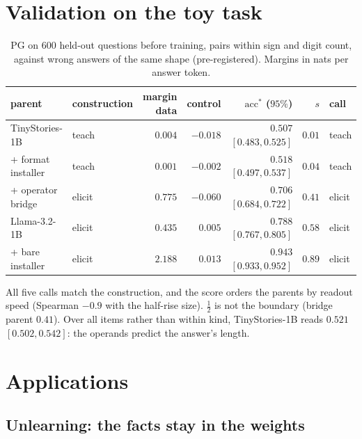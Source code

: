 \documentclass[11pt]{article}
\newcommand{\acc}{\mathrm{acc}^*}
\theoremstyle{definition}
\begin{document}
\section{Validation on the toy task}
\label{sec:toy}

\begin{table}[h]
\centering
\small
\begin{tabular}{llrrrrl}
\toprule
parent & construction & margin data & control & $\acc$ ($95\%$) & $s$ & call \\
\midrule
TinyStories-1B & teach & $0.004$ & $-0.018$ & $0.507$ $[0.483, 0.525]$ & $0.01$ & teach \\
\quad + format installer & teach & $0.001$ & $-0.002$ & $0.518$ $[0.497, 0.537]$ & $0.04$ & teach \\
\quad + operator bridge & elicit & $0.775$ & $-0.060$ & $0.706$ $[0.684, 0.722]$ & $0.41$ & elicit \\
Llama-3.2-1B & elicit & $0.435$ & $0.005$ & $0.788$ $[0.767, 0.805]$ & $0.58$ & elicit \\
\quad + bare installer & elicit & $2.188$ & $0.013$ & $0.943$ $[0.933, 0.952]$ & $0.89$ & elicit \\
\bottomrule
\end{tabular}
\caption{PG on $600$ held-out questions before training, pairs within sign and digit count, against wrong answers of
the same shape (pre-registered). Margins in nats per answer token.}
\label{tab:toypg}
\end{table}

All five calls match the construction, and the score orders the parents by readout speed (Spearman $-0.9$ with the
half-rise size). $\tfrac12$ is not the boundary (bridge parent $0.41$). Over all items rather than within kind,
TinyStories-1B reads $0.521$ $[0.502, 0.542]$: the operands predict the answer's length.

\section{Applications}
\label{sec:apps}

\subsection{Unlearning: the facts stay in the weights}
\label{sec:unlearning}
\end{document}
